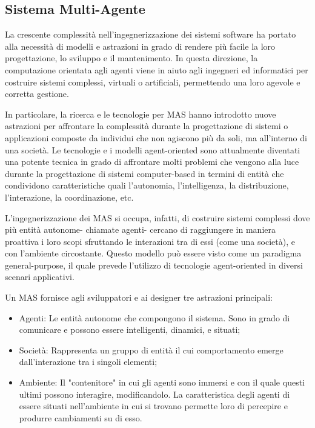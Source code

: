 \subsection{Sistema Multi-Agente} \label{sistema_multi-agente}

La crescente complessità nell'ingegnerizzazione dei sistemi software ha portato alla necessità di modelli e astrazioni in grado di rendere più facile la loro progettazione, lo sviluppo e il mantenimento. In questa direzione, la computazione orientata agli agenti viene in aiuto agli ingegneri ed informatici per costruire sistemi complessi, virtuali o artificiali, permettendo una loro agevole e corretta gestione.\cite{mas-as-complex-systems}

\medskip

In particolare, la ricerca e le tecnologie per MAS hanno introdotto nuove astrazioni per affrontare la complessità durante la progettazione di sistemi o applicazioni composte da individui che non agiscono più da soli, ma all'interno di una società. Le tecnologie e i modelli agent-oriented sono attualmente diventati una potente tecnica in grado di affrontare molti problemi che vengono alla luce durante la progettazione di sistemi computer-based in termini di entità che condividono caratteristiche quali l'autonomia, l'intelligenza, la distribuzione, l'interazione, la coordinazione, etc.

\medskip

L’ingegnerizzazione dei MAS si occupa, infatti, di costruire sistemi complessi dove più entità autonome- chiamate agenti- cercano di raggiungere in maniera proattiva i loro scopi sfruttando le interazioni tra di essi (come una società), e con l'ambiente circostante. Questo modello può essere visto come un paradigma general-purpose, il quale prevede l'utilizzo di tecnologie agent-oriented in diversi scenari applicativi. \cite{aose-jaamas9}

\medskip

Un MAS fornisce agli sviluppatori e ai designer tre astrazioni principali:
\begin{itemize}
    \item Agenti: Le entità autonome che compongono il sistema. Sono in grado di comunicare e possono essere intelligenti, dinamici, e situati;
    \item Società: Rappresenta un gruppo di entità il cui comportamento emerge dall'interazione tra i singoli elementi;
    \item Ambiente: Il "contenitore" in cui gli agenti sono immersi e con il quale questi ultimi possono interagire, modificandolo. La caratteristica degli agenti di essere situati nell'ambiente in cui si trovano permette loro di percepire e produrre cambiamenti su di esso.
\end{itemize}

